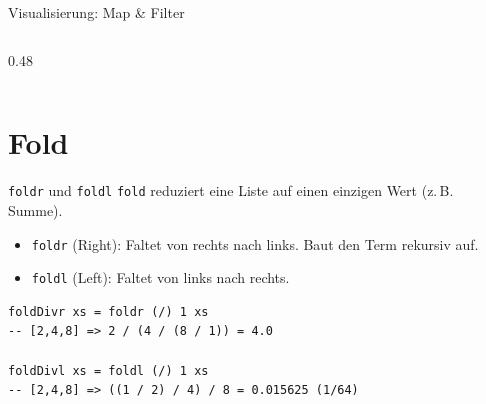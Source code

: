 \documentclass[aspectratio=169,11pt]{beamer}
\begin{document}
\begin{frame}[fragile]{Visualisierung: Map \& Filter}
\begin{columns}[T]
\begin{column}{0.48\textwidth}
\begin{center}
            \end{center}
        \end{column}
    \end{columns}
\end{frame}

\section{Fold}

\begin{frame}[fragile]{\texttt{foldr} und \texttt{foldl}}
    \texttt{fold} reduziert eine Liste auf einen einzigen Wert (z.\,B. Summe).
    \begin{itemize}
        \item \texttt{foldr} (Right): Faltet von rechts nach links. Baut den Term rekursiv auf.
        \item \texttt{foldl} (Left): Faltet von links nach rechts.
    \end{itemize}
    
    \begin{tcolorbox}[alertbox, title=Wichtig bei nicht-kommutativen Operationen (z.B. Division)]
\begin{lstlisting}
foldDivr xs = foldr (/) 1 xs
-- [2,4,8] => 2 / (4 / (8 / 1)) = 4.0

foldDivl xs = foldl (/) 1 xs
-- [2,4,8] => ((1 / 2) / 4) / 8 = 0.015625 (1/64)
\end{lstlisting}
    \end{tcolorbox}
\end{frame}
\end{document}
